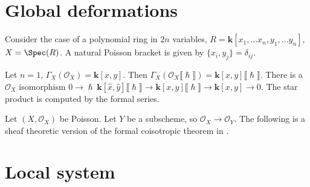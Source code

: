 \section{Global deformations}
    
    Consider the case of a polynomial ring in \(2n\) variables, \(R = \mathbf{k}[x_1, \dots x_n, y_1, \dots y_n]\), \(X= \Spec(R)\). A natural Poisson bracket is given by \( \{x_i,y_j\} = \delta_{ij}\).
    \begin{ex}
    Let \(n=1\), \( \Gamma_X( \mathcal{O}_X) = \mathbf{k}[x,y]\). Then  \(\Gamma_X (\mathcal{O}_X \lBrack \hslash \rBrack) = \mathbf{k}[x,y]\lBrack \hslash \rBrack \). There is a \(\mathcal{O}_X\) isomorphism  \(0 \rightarrow \hslash\, \mathbf{k}[\hat{x},\hat{y}]\lBrack \hslash \rBrack \rightarrow \mathbf{k}[x,y]\lBrack \hslash \rBrack  \rightarrow \mathbf{k}[x,y] \rightarrow 0\). The star product is computed by the formal series.
    \end{ex}
    

    Let \( (X,\mathcal{O}_X)\) be Poisson.
    Let \(Y\) be a subscheme, so \( \mathcal{O}_X \rightarrow \mathcal{O}_Y\). The following is a sheaf theoretic version of the formal coisotropic theorem in \cite{dasilva}.
    
    \begin{thm} 
 
    \end{thm}
    
    



\section{Local system}
    
